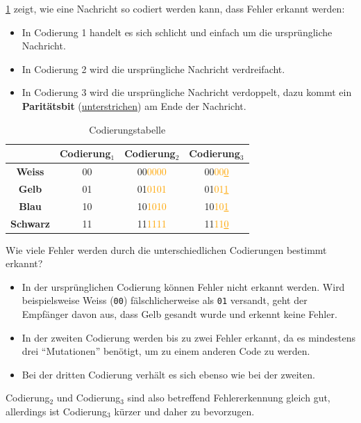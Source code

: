 \begin{myexample}\label{ex:code-kerk}
\cref{tab:codes} zeigt, wie eine Nachricht so codiert werden kann, dass Fehler erkannt werden:
\begin{itemize}
    \item In Codierung 1 handelt es sich schlicht und einfach um die ursprüngliche Nachricht.
    \item In Codierung 2 wird die ursprüngliche Nachricht verdreifacht.
    \item In Codierung 3 wird die ursprüngliche Nachricht verdoppelt, dazu kommt ein \textbf{Paritätsbit} (\underline{unterstrichen}) am Ende der Nachricht.
\end{itemize}
\begin{table}[H]
    \centering
    \begin{tabular}{cccc}
                         & \textbf{Codierung$_1$} & \textbf{Codierung$_2$}     & \textbf{Codierung$_3$}                \\
        \midrule
        \textbf{Weiss}   & 00                     & 00\textcolor{orange}{0000} & 00\textcolor{orange}{00\underline{0}} \\
        \midrule
        \textbf{Gelb}    & 01                     & 01\textcolor{orange}{0101} & 01\textcolor{orange}{01\underline{1}} \\
        \midrule
        \textbf{Blau}    & 10                     & 10\textcolor{orange}{1010} & 10\textcolor{orange}{10\underline{1}} \\
        \midrule
        \textbf{Schwarz} & 11                     & 11\textcolor{orange}{1111} & 11\textcolor{orange}{11\underline{0}} \\
    \end{tabular}
    \caption{Codierungstabelle}
    \label{tab:codes}
\end{table}

Wie viele Fehler werden durch die unterschiedlichen Codierungen bestimmt erkannt?
\begin{itemize}
    \item In der ursprünglichen Codierung können Fehler nicht erkannt werden. Wird beispielsweise Weiss (\texttt{00}) fälschlicherweise als \texttt{01} versandt, geht der Empfänger davon aus, dass Gelb gesandt wurde und erkennt keine Fehler.
    \item In der zweiten Codierung werden bis zu zwei Fehler erkannt, da es mindestens drei \enquote{Mutationen} benötigt, um zu einem anderen Code zu werden.
    \item Bei der dritten Codierung verhält es sich ebenso wie bei der zweiten.
\end{itemize}
Codierung$_2$ und Codierung$_3$ sind also betreffend Fehlererkennung gleich gut, allerdings ist Codierung$_3$ kürzer und daher zu bevorzugen.
\end{myexample}

